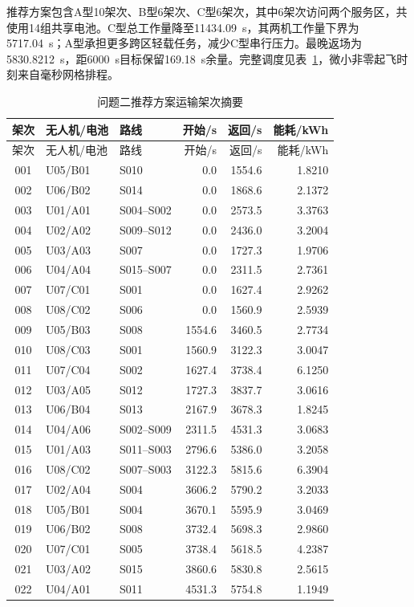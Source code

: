 推荐方案包含A型10架次、B型6架次、C型6架次，其中6架次访问两个服务区，共使用14组共享电池。C型总工作量降至11434.09~s，其两机工作量下界为5717.04~s；A型承担更多跨区轻载任务，减少C型串行压力。最晚返场为5830.8212~s，距6000~s目标保留169.18~s余量。完整调度见表~\ref{tab:q2-schedule}，微小非零起飞时刻来自毫秒网格排程。

\begin{longtable}{cllrrr}
\caption{问题二推荐方案运输架次摘要}\label{tab:q2-schedule}\\
\toprule
架次 & 无人机/电池 & 路线 & 开始/s & 返回/s & 能耗/kWh\\
\midrule
\endfirsthead
\toprule
架次 & 无人机/电池 & 路线 & 开始/s & 返回/s & 能耗/kWh\\
\midrule
\endhead
001 & U05/B01 & S010 & 0.0 & 1554.6 & 1.8210\\
002 & U06/B02 & S014 & 0.0 & 1868.6 & 2.1372\\
003 & U01/A01 & S004--S002 & 0.0 & 2573.5 & 3.3763\\
004 & U02/A02 & S009--S012 & 0.0 & 2436.0 & 3.2004\\
005 & U03/A03 & S007 & 0.0 & 1727.3 & 1.9706\\
006 & U04/A04 & S015--S007 & 0.0 & 2311.5 & 2.7361\\
007 & U07/C01 & S001 & 0.0 & 1627.4 & 2.9262\\
008 & U08/C02 & S006 & 0.0 & 1560.9 & 2.5939\\
009 & U05/B03 & S008 & 1554.6 & 3460.5 & 2.7734\\
010 & U08/C03 & S001 & 1560.9 & 3122.3 & 3.0047\\
011 & U07/C04 & S002 & 1627.4 & 3738.4 & 6.1250\\
012 & U03/A05 & S012 & 1727.3 & 3837.7 & 3.0616\\
013 & U06/B04 & S013 & 2167.9 & 3678.3 & 1.8245\\
014 & U04/A06 & S002--S009 & 2311.5 & 4531.3 & 3.0683\\
015 & U01/A03 & S011--S003 & 2796.6 & 5386.0 & 3.2058\\
016 & U08/C02 & S007--S003 & 3122.3 & 5815.6 & 6.3904\\
017 & U02/A04 & S004 & 3606.2 & 5790.2 & 3.2033\\
018 & U05/B01 & S004 & 3670.1 & 5595.9 & 3.0469\\
019 & U06/B02 & S008 & 3732.4 & 5698.3 & 2.9860\\
020 & U07/C01 & S005 & 3738.4 & 5618.5 & 4.2387\\
021 & U03/A02 & S015 & 3860.6 & 5830.8 & 2.5615\\
022 & U04/A01 & S011 & 4531.3 & 5754.8 & 1.1949\\
\bottomrule
\end{longtable}

